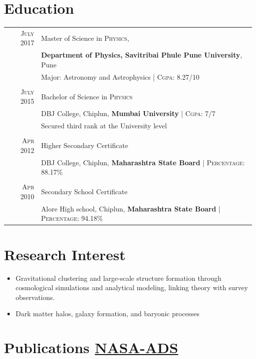 \documentclass[a4paper,10pt]{article}
\begin{document}
\section{Education}
\begin{tabular}{rl}	
\textsc{July} 2017 & Master of Science in \textsc{Physics}, \\ &\textbf{Department of Physics, Savitribai Phule Pune University}, Pune\\
& Major: Astronomy and Astrophysics | \normalsize \textsc{Cgpa}: 8.27/10 \\&\\

\textsc{July} 2015& Bachelor of Science in \textsc{Physics} \\& DBJ College, Chiplun, \normalsize\textbf{Mumbai University} | \normalsize \textsc{Cgpa}: 7/7 
\\& Secured third rank at the University level\\&\\

\textsc{Apr} 2012& Higher Secondary Certificate\\
& DBJ College, Chiplun, \textbf{Maharashtra State Board} | \textsc{Percentage}: 88.17\% \\&\\

\textsc{Apr} 2010& Secondary School Certificate\\
& Alore High school, Chiplun, \textbf{Maharashtra State Board} | \textsc{Percentage}: 94.18\% \\
\end{tabular}

\section{Research Interest}
\begin{itemize}
    \item Gravitational clustering and large-scale structure formation through cosmological simulations and analytical modeling, linking theory with survey observations.
    \item Dark matter halos, galaxy formation, and baryonic processes
\end{itemize}

\section{Publications \href{https://tinyurl.com/2vhkj2m6}{\small{NASA-ADS}}}
\end{document}
